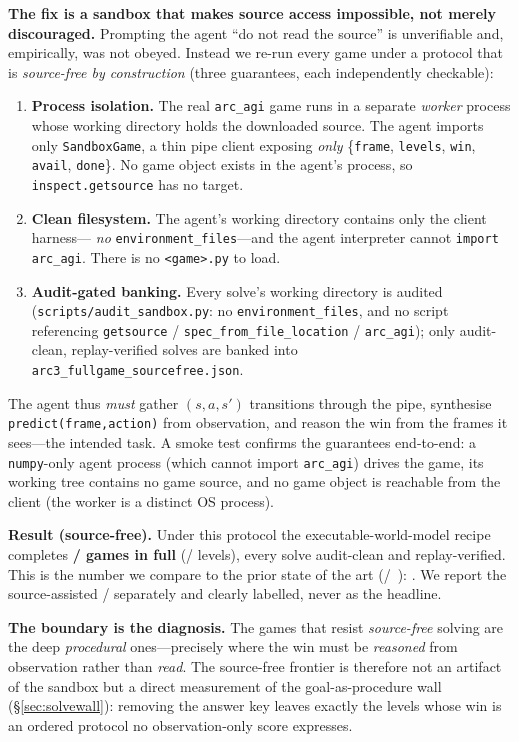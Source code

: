 \textbf{The fix is a sandbox that makes source access impossible, not merely discouraged.} Prompting
the agent ``do not read the source'' is unverifiable and, empirically, was not obeyed. Instead we
re-run every game under a protocol that is \emph{source-free by construction} (three guarantees,
each independently checkable):
\begin{enumerate}\setlength{\itemsep}{1pt}
\item \textbf{Process isolation.} The real \texttt{arc\_agi} game runs in a separate \emph{worker}
process whose working directory holds the downloaded source. The agent imports only
\texttt{SandboxGame}, a thin pipe client exposing \emph{only} \{\texttt{frame}, \texttt{levels},
\texttt{win}, \texttt{avail}, \texttt{done}\}. No game object exists in the agent's process, so
\texttt{inspect.getsource} has no target.
\item \textbf{Clean filesystem.} The agent's working directory contains only the client harness---%
\emph{no} \texttt{environment\_files}---and the agent interpreter cannot \texttt{import arc\_agi}. There
is no \texttt{<game>.py} to load.
\item \textbf{Audit-gated banking.} Every solve's working directory is audited
(\texttt{scripts/audit\_sandbox.py}: no \texttt{environment\_files}, and no script referencing
\texttt{getsource} / \texttt{spec\_from\_file\_location} / \texttt{arc\_agi}); only audit-clean,
replay-verified solves are banked into \texttt{arc3\_fullgame\_sourcefree.json}.
\end{enumerate}
The agent thus \emph{must} gather \((s,a,s')\) transitions through the pipe, synthesise
\texttt{predict(frame,action)} from observation, and reason the win from the frames it sees---the
intended task. A smoke test confirms the guarantees end-to-end: a \texttt{numpy}-only agent process
(which cannot import \texttt{arc\_agi}) drives the game, its working tree contains no game source, and
no game object is reachable from the client (the worker is a distinct OS process).

\textbf{Result (source-free).} Under this protocol the executable-world-model recipe completes
\textbf{\ArcSourceFreeFull/\ArcUnionGames{} games in full} (\ArcSourceFreeLevels/\ArcTotalLevels{}
levels), every solve audit-clean and replay-verified. This is the number we compare to the prior state
of the art (\ArcBaselineFull/\ArcUnionGames~\cite{baseline1_ewm}): \ArcSourceFreeVsSota. We report the
source-assisted \ArcSourceAssistedFull/\ArcUnionGames{} separately and clearly labelled, never as the
headline.

\textbf{The boundary is the diagnosis.} The games that resist \emph{source-free} solving are the deep
\emph{procedural} ones---precisely where the win must be \emph{reasoned} from observation rather than
\emph{read}. The source-free frontier is therefore not an artifact of the sandbox but a direct
measurement of the goal-as-procedure wall (\S\ref{sec:solvewall}): removing the answer key leaves
exactly the levels whose win is an ordered protocol no observation-only score expresses.
